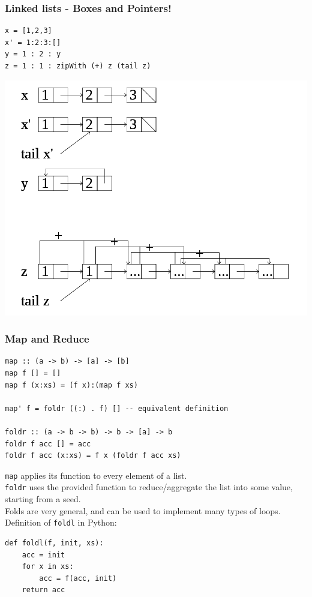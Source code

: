 \documentclass{beamer}
\begin{document}
\begin{frame}[fragile]
\frametitle{Linked lists - Boxes and Pointers!}
\begin{Verbatim}[frame=single, fontsize=\scriptsize]
x = [1,2,3]
x' = 1:2:3:[]
y = 1 : 2 : y
z = 1 : 1 : zipWith (+) z (tail z)
\end{Verbatim}
\includegraphics[scale=0.25]{LinkedListExamples.png}
\end{frame}

\begin{frame}[fragile]
\frametitle{Map and Reduce}
\begin{Verbatim}[frame=single, fontsize=\scriptsize]
map :: (a -> b) -> [a] -> [b]
map f [] = []
map f (x:xs) = (f x):(map f xs)

map' f = foldr ((:) . f) [] -- equivalent definition

foldr :: (a -> b -> b) -> b -> [a] -> b
foldr f acc [] = acc
foldr f acc (x:xs) = f x (foldr f acc xs)
\end{Verbatim}
\verb|map| applies its function to every element of a list.\\
\verb|foldr| uses the provided function to reduce/aggregate the list into some value, starting from a seed.\\
Folds are very general, and can be used to implement many types of loops.\\
Definition of \verb|foldl| in Python:
\begin{Verbatim}[frame=single, fontsize=\scriptsize]
def foldl(f, init, xs):
    acc = init
    for x in xs:
        acc = f(acc, init)
    return acc
\end{Verbatim}
\end{frame}
\end{document}
